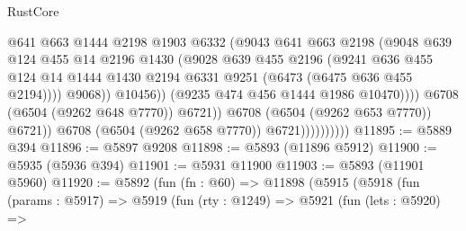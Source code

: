 \begin{lexlean}{RustCore}
\begin{coremodule}
                                          @641
                                          @663
                                          @1444
                                          @2198
                                          @1903
                                          @6332
                                          (@9043
                                            @641
                                            @663
                                            @2198
                                            (@9048
                                              @639
                                              @124
                                              @455
                                              @14
                                              @2196
                                              @1430
                                              (@9028
                                                @639
                                                @455
                                                @2196
                                                (@9241
                                                  @636
                                                  @455
                                                  @124
                                                  @14
                                                  @1444
                                                  @1430
                                                  @2194
                                                  @6331
                                                  @9251
                                                  (@6473 (@6475 @636 @455 @2194))))
                                              @9068))
                                          @10456))
                                      (@9235 @474 @456 @1444 @1986 @10470))))
                                @6708
                                (@6504 (@9262 @648 @7770))
                                @6721))
                            @6708
                            (@6504 (@9262 @653 @7770))
                            @6721))
                        @6708
                        (@6504 (@9262 @658 @7770))
                        @6721))))))))))
@11895 := @5889 @394
@11896 := @5897 @9208
@11898 := @5893 (@11896 @5912)
@11900 := @5935 (@5936 @394)
@11901 := @5931 @11900
@11903 := @5893 (@11901 @5960)
@11920 := @5892
    (fun (fn : @60) =>
    @11898
      (@5915
        (@5918
          (fun (params : @5917) =>
          @5919
            (fun (rty : @1249) =>
            @5921
              (fun (lets : @5920) =>

\end{coremodule}
\end{lexlean}
